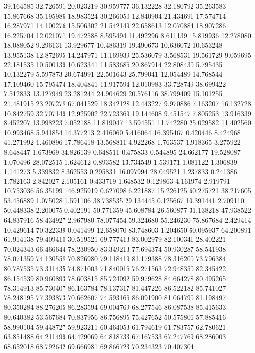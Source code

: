 39.164585
32.726591
20.023219
30.959777
36.132228
32.180792
35.263583
15.867668
35.195986
18.983524
30.266050
12.840904
21.434691
17.574714
16.287971
14.100276
15.506302
21.542149
22.658613
12.070884
18.907286
16.225704
12.021077
19.472588
8.595494
11.492296
8.611139
15.819936
12.278080
18.088052
9.296131
13.929677
10.486319
19.490673
10.636072
10.653248
13.955138
12.872695
14.247971
11.169939
25.536079
3.568531
19.561729
9.059695
22.181535
10.500139
10.623341
11.583686
20.867914
22.808430
5.795435
10.132279
5.597873
20.674991
22.501643
25.799041
12.054489
14.768544
17.109460
15.795474
18.404841
11.917594
12.010983
33.728749
38.699422
7.512833
13.127949
23.281244
24.904629
20.576116
38.799409
15.101255
21.481915
23.207278
67.041529
18.342128
12.443227
9.970886
7.163207
16.132728
10.842759
32.707149
12.925902
22.723369
19.144608
9.451547
7.805253
13.916339
8.452207
13.998223
7.052188
11.819047
13.594551
11.742280
25.029582
11.402560
10.993468
5.941854
14.377213
2.416060
5.416064
16.395467
0.420446
8.424968
41.271992
1.460896
17.786418
13.568811
4.922268
1.763537
1.918365
3.275922
8.648447
1.673969
34.826139
0.648511
0.475833
0.544895
24.662177
19.528087
1.070496
28.072515
1.624612
0.893582
13.734549
1.539171
1.081122
1.306839
1.141273
5.339832
8.362553
0.295831
16.097994
28.049521
1.237833
0.241386
1.782163
2.842027
2.105161
0.433719
1.648532
0.129863
4.161974
2.919791
10.753036
56.351991
46.925919
0.627098
6.221887
15.226125
60.275721
38.217605
53.456889
1.075028
1.591106
38.738535
29.134445
0.125667
10.391441
2.709110
50.448338
2.200075
0.402191
50.771359
45.608784
26.560877
31.138218
47.938522
64.837916
58.434927
2.967980
78.077454
59.324680
55.246230
75.867684
2.429414
10.429614
70.322339
0.041499
12.658070
83.748603
1.204650
60.095937
64.200891
61.914138
79.409410
30.519521
69.777413
83.002979
82.100341
28.402221
70.024343
66.466644
78.230950
83.349213
77.694374
50.930287
58.541938
78.071359
74.130558
70.826980
79.118419
81.179388
78.316200
73.796384
80.787535
73.311435
74.871003
71.840016
76.271563
72.948350
82.345422
86.154539
80.960893
78.603815
85.724092
59.979628
84.664278
80.495265
78.314913
85.730407
86.163784
78.137317
81.447226
86.522182
85.741027
78.248195
77.393873
70.662607
74.593166
86.091900
81.064790
81.198497
80.350284
88.276205
86.283594
69.004769
68.277546
86.087538
85.415633
80.640382
53.567684
70.837956
86.756895
75.427652
50.575806
57.885416
58.990104
59.448727
59.923211
60.464053
61.794619
61.783757
62.780621
63.851488
64.211499
64.429069
64.818733
67.167533
67.247769
68.286003
68.652018
68.792642
69.666981
69.866723
70.234323
70.407304
